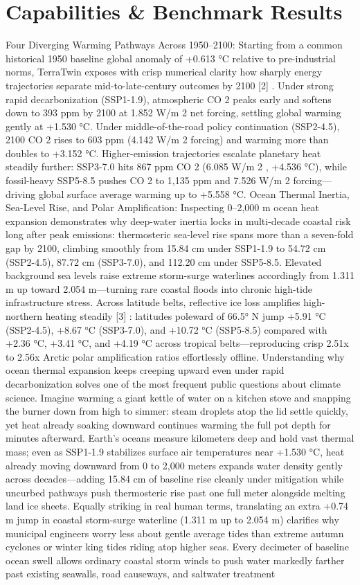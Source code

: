 \documentclass[10pt,letterpaper]{article}
\begin{document}
\section{Capabilities \& Benchmark Results}
Four Diverging Warming Pathways Across 1950--2100: Starting from a common historical 1950 baseline global anomaly of +0.613 °C relative to pre-industrial norms, TerraTwin exposes with crisp numerical clarity how sharply energy trajectories separate mid-to-late-century outcomes by 2100 [2] . Under strong rapid decarbonization (SSP1-1.9), atmospheric CO 2 peaks early and softens down to 393 ppm by 2100 at 1.852 W/m 2 net forcing, settling global warming gently at +1.530 °C. Under middle-of-the-road policy continuation (SSP2-4.5), 2100 CO 2 rises to 603 ppm (4.142 W/m 2 forcing) and warming more than doubles to +3.152 °C. Higher-emission trajectories escalate planetary heat steadily further: SSP3-7.0 hits 867 ppm CO 2 (6.085 W/m 2 , +4.536 °C), while fossil-heavy SSP5-8.5 pushes CO 2 to 1,135 ppm and 7.526 W/m 2 forcing---driving global surface average warming up to +5.558 °C. Ocean Thermal Inertia, Sea-Level Rise, and Polar Amplification: Inspecting 0--2,000 m ocean heat expansion demonstrates why deep-water inertia locks in multi-decade coastal risk long after peak emissions: thermosteric sea-level rise spans more than a seven-fold gap by 2100, climbing smoothly from 15.84 cm under SSP1-1.9 to 54.72 cm (SSP2-4.5), 87.72 cm (SSP3-7.0), and 112.20 cm under SSP5-8.5. Elevated background sea levels raise extreme storm-surge waterlines accordingly from 1.311 m up toward 2.054 m---turning rare coastal floods into chronic high-tide infrastructure stress. Across latitude belts, reflective ice loss amplifies high-northern heating steadily [3] : latitudes poleward of 66.5° N jump +5.91 °C (SSP2-4.5), +8.67 °C (SSP3-7.0), and +10.72 °C (SSP5-8.5) compared with +2.36 °C, +3.41 °C, and +4.19 °C across tropical belts---reproducing crisp 2.51x to 2.56x Arctic polar amplification ratios effortlessly offline. Understanding why ocean thermal expansion keeps creeping upward even under rapid decarbonization solves one of the most frequent public questions about climate science. Imagine warming a giant kettle of water on a kitchen stove and snapping the burner down from high to simmer: steam droplets atop the lid settle quickly, yet heat already soaking downward continues warming the full pot depth for minutes afterward. Earth's oceans measure kilometers deep and hold vast thermal mass; even as SSP1-1.9 stabilizes surface air temperatures near +1.530 °C, heat already moving downward from 0 to 2,000 meters expands water density gently across decades---adding 15.84 cm of baseline rise cleanly under mitigation while uncurbed pathways push thermosteric rise past one full meter alongside melting land ice sheets. Equally striking in real human terms, translating an extra +0.74 m jump in coastal storm-surge waterline (1.311 m up to 2.054 m) clarifies why municipal engineers worry less about gentle average tides than extreme autumn cyclones or winter king tides riding atop higher seas. Every decimeter of baseline ocean swell allows ordinary coastal storm winds to push water markedly farther past existing seawalls, road causeways, and saltwater treatment 
\end{document}
